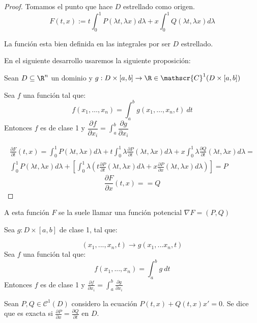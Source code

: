 \begin{proof}
Tomamos el punto que hace $D$ estrellado como origen.
\[
F(t,x) := t \int _0 ^1 P(\lambda t, \lambda x) d\lambda + x \int _0 ^1 Q(\lambda t, \lambda x ) d\lambda
\]

La función esta bien definida en las integrales por ser $D$ estrellado.

En el siguiente desarrollo usaremos la siguiente proposición:

\begin{nprop}
  Sean $D \subseteq \R^n$ un dominio y $g: D\times [a,b] \to \R \in \mathscr{C}^1(D\times [a,b])$

Sea $f$ una función tal que: 
\[
f(x_1,\dots,x_n) = \int _a ^b g(x_1,\dots,x_n,t) \ dt
\]
Entonces $f$ es de clase 1 y $\dfrac{\partial f}{\partial x_i} = \displaystyle\int _a ^b \dfrac{\partial g}{\partial x_i}$


\end{nprop}

\[
\begin{array}{l}
  \frac{\partial F}{\partial t} (t,x) = \int _0 ^1 P(\lambda t, \lambda x) d\lambda + t \int _0 ^1 \lambda \frac{\partial P}{\partial t}(\lambda t, \lambda x) d\lambda + x\int _0 ^1 \lambda \frac{\partial Q}{\partial t}(\lambda t, \lambda x) d\lambda =\\
  \int_0^1 P(\lambda t, \lambda x)d\lambda + \left[\int_0^1 \lambda\left( t\frac{\partial P}{\partial t}(\lambda t, \lambda x)d\lambda + x\frac{\partial P}{\partial x}(\lambda t, \lambda x)d\lambda \right) \right] = P
\end{array}
\]
\[
\frac{\partial F}{\partial x} (t,x) =  = Q
\]

\end{proof}

A esta función $F$ se la suele llamar una función potencial $\nabla F = (P,Q)$

\begin{nth}
Sea $g: D\times [a,b]$ de clase 1, tal que: 

\[
(x_1,..., x_n, t) \to g(x_1,... x_n, t)
\]
Sea $f$ una función tal que: 
\[
f(x_1,...,x_n) = \int _a ^b g \ dt
\]
Entonces $f$ es de clase 1 y $\frac{\partial f}{\partial x_i} = \int _a ^b \frac{\partial g}{\partial x_i}$


\end{nth}
\begin{ndef}
Sean $P,Q \in \mathscr{C}^1 (D)$ considero la ecuación $P(t,x) + Q(t,x) x' = 0$. Se dice que es exacta si $\frac{\partial P}{\partial x} = \frac{\partial Q}{\partial t}$ en $D$.
\end{ndef}

